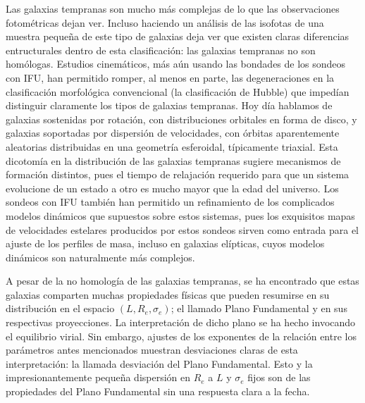 \documentclass[a4paper,twoside]{article}
\begin{document}
Las galaxias tempranas son mucho más complejas de lo que las observaciones fotométricas dejan ver. Incluso haciendo un análisis de las isofotas de una muestra pequeña de este tipo de galaxias deja ver que existen claras diferencias entructurales dentro de esta clasificación: las galaxias tempranas no son homólogas. Estudios cinemáticos, más aún usando las bondades de los sondeos con IFU, han permitido romper, al menos en parte, las degeneraciones en la clasificación morfológica convencional (la clasificación de Hubble) que impedían distinguir claramente los tipos de galaxias tempranas. Hoy día hablamos de galaxias sostenidas por rotación, con distribuciones orbitales en forma de disco, y galaxias soportadas por dispersión de velocidades, con órbitas aparentemente aleatorias distribuidas en una geometría esferoidal, típicamente triaxial. Esta dicotomía en la distribución de las galaxias tempranas sugiere mecanismos de formación distintos, pues el tiempo de relajación requerido para que un sistema evolucione de un estado a otro es mucho mayor que la edad del universo. Los sondeos con IFU también han permitido un refinamiento de los complicados modelos dinámicos que supuestos sobre estos sistemas, pues los exquisitos mapas de velocidades estelares producidos por estos sondeos sirven como entrada para el ajuste de los perfiles de masa, incluso en galaxias elípticas, cuyos modelos dinámicos son naturalmente más complejos.

A pesar de la no homología de las galaxias tempranas, se ha encontrado que estas galaxias comparten muchas propiedades físicas que pueden resumirse en su distribución en el espacio $(L, R_e, \sigma_e)$; el llamado Plano Fundamental y en sus respectivas proyecciones. La interpretación de dicho plano se ha hecho invocando el equilibrio virial. Sin embargo, ajustes de los exponentes de la relación entre los parámetros antes mencionados muestran desviaciones claras de esta interpretación: la llamada desviación del Plano Fundamental. Esto y la impresionantemente pequeña dispersión en $R_e$ a $L$ y $\sigma_e$ fijos son de las propiedades del Plano Fundamental sin una respuesta clara a la fecha.
\end{document}
